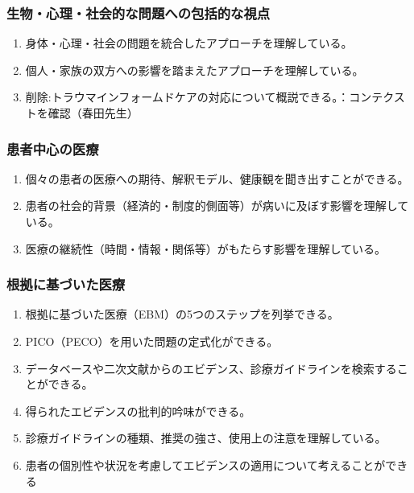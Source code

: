 \hypertarget{ux751fux7269ux5fc3ux7406ux793eux4f1aux7684ux306aux554fux984cux3078ux306eux5305ux62ecux7684ux306aux8996ux70b9}{%
\subsubsection{生物・心理・社会的な問題への包括的な視点}\label{ux751fux7269ux5fc3ux7406ux793eux4f1aux7684ux306aux554fux984cux3078ux306eux5305ux62ecux7684ux306aux8996ux70b9}}

\begin{enumerate}
\def\labelenumi{\arabic{enumi}.}
\tightlist
\item
  身体・心理・社会の問題を統合したアプローチを理解している。
\item
  個人・家族の双方への影響を踏まえたアプローチを理解している。
\item
  削除:トラウマインフォームドケアの対応について概説できる。：コンテクストを確認（春田先生）
\end{enumerate}

\hypertarget{ux60a3ux8005ux4e2dux5fc3ux306eux533bux7642}{%
\subsubsection{患者中心の医療}\label{ux60a3ux8005ux4e2dux5fc3ux306eux533bux7642}}

\begin{enumerate}
\def\labelenumi{\arabic{enumi}.}
\tightlist
\item
  個々の患者の医療への期待、解釈モデル、健康観を聞き出すことができる。
\item
  患者の社会的背景（経済的・制度的側面等）が病いに及ぼす影響を理解している。
\item
  医療の継続性（時間・情報・関係等）がもたらす影響を理解している。
\end{enumerate}

\hypertarget{ux6839ux62e0ux306bux57faux3065ux3044ux305fux533bux7642}{%
\subsubsection{根拠に基づいた医療}\label{ux6839ux62e0ux306bux57faux3065ux3044ux305fux533bux7642}}

\begin{enumerate}
\def\labelenumi{\arabic{enumi}.}
\tightlist
\item
  根拠に基づいた医療（EBM）の5つのステップを列挙できる。
\item
  PICO（PECO）を用いた問題の定式化ができる。
\item
  データベースや二次文献からのエビデンス、診療ガイドラインを検索することができる。
\item
  得られたエビデンスの批判的吟味ができる。
\item
  診療ガイドラインの種類、推奨の強さ、使用上の注意を理解している。
\item
  患者の個別性や状況を考慮してエビデンスの適用について考えることができる
\end{enumerate}

